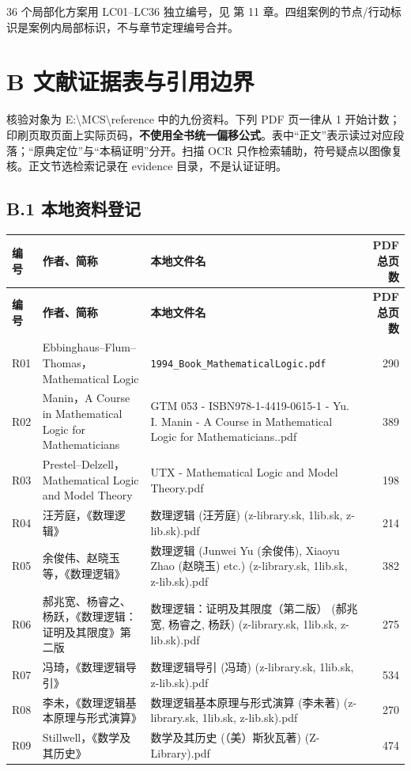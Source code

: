 \documentclass[UTF8,a4paper,zihao=-4,fontset=windows,openany]{ctexbook}
\newcommand{\mcsorigin}[1]{\par\noindent{\small\color{black!55}#1}\par\addvspace{0.8em}}
\newcommand{\mcsbrk}{\penalty 200\relax}
\begin{document}
36 个局部化方案用 LC01–LC36 独立编号，见 第 11 章。四组案例的节点/行动标识是案例内局部标识，不与章节定理编号合并。

\clearpage\chapter{B 文献证据表与引用边界}
\mcsorigin{原章节：B-文献证据表.md}
核验对象为 E:\textbackslash{}MCS\textbackslash{}reference 中的九份资料。下列 PDF 页一律从 1 开始计数；印刷页取页面上实际页码，\textbf{不使用全书统一偏移公式}。表中“正文”表示读过对应段落；“原典定位”与“本稿证明”分开。扫描 OCR 只作检索辅助，符号疑点以图像复核。正文节选检索记录在 evidence 目录，不是认证证明。

\section{B.1 本地资料登记}
\begingroup\small\setlength{\tabcolsep}{4pt}
\begin{longtable}{l>{\raggedright\arraybackslash}p{}>{\raggedright\arraybackslash}p{}r}
\toprule
\textbf{编号} & \textbf{作者、简称} & \textbf{本地文件名} & \textbf{PDF 总页数} \\
\midrule
\endfirsthead
\toprule
\textbf{编号} & \textbf{作者、简称} & \textbf{本地文件名} & \textbf{PDF 总页数} \\
\midrule
\endhead
\bottomrule
\endfoot
\bottomrule
\endlastfoot
R01 & Ebbinghaus–Flum–Thomas，Mathematical Logic & \texttt{1994\mcsbrk\_Book\mcsbrk\_Mathem\mcsbrk{}atical\mcsbrk{}Logic.pdf} & 290 \\
R02 & Manin，A Course in Mathematical Logic for Mathematicians & GTM 053 - ISBN978-1-4419-0615-1 - Yu. I. Manin - A Course in Mathematical Logic for Mathematicians..pdf & 389 \\
R03 & Prestel–Delzell，Mathematical Logic and Model Theory & UTX - Mathematical Logic and Model Theory.pdf & 198 \\
R04 & 汪芳庭，《数理逻辑》 & 数理逻辑 (汪芳庭) (z-library.sk, 1lib.sk, z-lib.sk).pdf & 214 \\
R05 & 余俊伟、赵晓玉等，《数理逻辑》 & 数理逻辑 (Junwei Yu (余俊伟), Xiaoyu Zhao (赵晓玉) etc.) (z-library.sk, 1lib.sk, z-lib.sk).pdf & 382 \\
R06 & 郝兆宽、杨睿之、杨跃，《数理逻辑：证明及其限度》第二版 & 数理逻辑：证明及其限度（第二版） (郝兆宽, 杨睿之, 杨跃) (z-library.sk, 1lib.sk, z-lib.sk).pdf & 275 \\
R07 & 冯琦，《数理逻辑导引》 & 数理逻辑导引 (冯琦) (z-library.sk, 1lib.sk, z-lib.sk).pdf & 534 \\
R08 & 李未，《数理逻辑基本原理与形式演算》 & 数理逻辑基本原理与形式演算 (李未著) (z-library.sk, 1lib.sk, z-lib.sk).pdf & 270 \\
R09 & Stillwell，《数学及其历史》 & 数学及其历史 (（美）斯狄瓦著) (Z-Library).pdf & 474 \\
\end{longtable}
\endgroup
\end{document}

